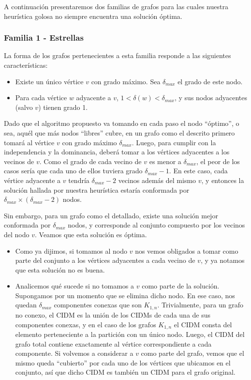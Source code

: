 \vspace*{0.3cm}

A continuación presentaremos dos familias de grafos para las cuales nuestra heurística golosa no siempre encuentra una solución óptima.

\subsubsection*{Familia 1 - Estrellas}

La forma de los grafos pertenecientes a esta familia responde a las siguientes características:

\begin{itemize}
\item Existe un único vértice $v$ con grado máximo.  Sea $\delta_{max}$ el grado de este nodo.
\item Para cada vértice $w$ adyacente a $v$, $1 < \delta(w) < \delta_{max}$, y sus nodos adyacentes (salvo $v$) tienen grado 1.	
\end{itemize}

Dado que el algoritmo propuesto va tomando en cada paso el nodo ``óptimo'', o sea, aquél que más nodos ``libres'' cubre, en un grafo como el descrito primero tomará al vértice $v$ con grado máximo $\delta_{max}$.  Luego, para cumplir con la independencia y la dominancia, deberá tomar a los vértices adyacentes a los vecinos de $v$. Como el grado de cada vecino de $v$ es menor a $\delta_{max}$, el peor de los casos sería que cada uno de ellos tuviera grado $\delta_{max} - 1$.  En este caso, cada vértice adyacente a $v$ tendría $\delta_{max} - 2$ vecinos además del mismo $v$, y entonces la solución hallada por nuestra heurística estaría conformada por $\delta_{max} \times (\delta_{max} - 2)$ nodos.  

Sin embargo, para un grafo como el detallado, existe una solución mejor conformada por $\delta_{max}$ nodos, y corresponde al conjunto compuesto por los vecinos del nodo $v$. Veamos que esta solución es óptima.

\begin{itemize}
	\item Como ya dijimos, si tomamos al nodo $v$ nos vemos obligados a tomar como parte del conjunto a los vértices adyacentes a cada vecino de $v$, y ya notamos que esta solución no es buena.
	\item Analicemos qué sucede si no tomamos a $v$ como parte de la solución. Supongamos por un momento que se elimina dicho nodo.  En ese caso, nos quedan $\delta_{max}$ componentes conexas que son $K_{1,n}$.  Trivialmente, para un grafo no conexo, el CIDM es la unión de los CIDMs de cada una de sus componentes conexas, y en el caso de los grafos $K_{1,n}$ el CIDM consta del elemento perteneciente a la partición con un único nodo. Luego, el CIDM del grafo total contiene exactamente al vértice correspondiente a cada componente.  Si volvemos a considerar a $v$ como parte del grafo, vemos que el mismo queda ``cubierto'' por cada uno de los vértices que ubicamos en el conjunto, así que dicho CIDM es también un CIDM para el grafo original.
\end{itemize}

